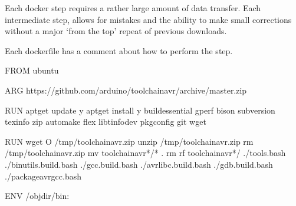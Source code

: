 \documentclass[letterpaper,10pt,english,openany,oneside]{sphinxmanual}
\begin{document}
\sphinxAtStartPar
Each docker step requires a rather large amount of data transfer. Each
intermediate step, allows for mistakes and the ability to make small
corrections without a major ‘from the top’ repeat of previous downloads.

\sphinxAtStartPar
Each dockerfile has a comment about how to perform the step.

\begin{sphinxVerbatim}[commandchars=\\\{\},numbers=left,firstnumber=1,stepnumber=1]
FROM ubuntu

ARG https://github.com/arduino/toolchain\PYGZhy{}avr/archive/master.zip

RUN apt\PYGZhy{}get update \PYGZhy{}y  
    apt\PYGZhy{}get install \PYGZhy{}y 
        build\PYGZhy{}essential 
        gperf 
        bison 
        subversion 
        texinfo 
        zip 
        automake 
        flex 
        libtinfo\PYGZhy{}dev 
        pkg\PYGZhy{}config 
        git 
        wget

RUN wget  \PYGZhy{}O /tmp/toolchain\PYGZhy{}avr.zip  
    unzip /tmp/toolchain\PYGZhy{}avr.zip  
    rm /tmp/toolchain\PYGZhy{}avr.zip  
    mv toolchain\PYGZhy{}avr*/* .  
    rm \PYGZhy{}rf toolchain\PYGZhy{}avr*/  
    ./tools.bash  
    ./binutils.build.bash  
    ./gcc.build.bash  
    ./avr\PYGZhy{}libc.build.bash  
    ./gdb.build.bash  
    ./package\PYGZhy{}avr\PYGZhy{}gcc.bash

ENV /objdir/bin:
\end{sphinxVerbatim}
\end{document}
